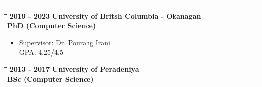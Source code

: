 \documentclass[a4paper,11pt]{article}
\begin{document}
\vspace{15pt}
\noindent\textbf{\large{}}
\vspace{-8pt}\noindent\\\rule{0.75\textwidth}{0.4pt}
\vspace{-8pt}
\begin{tabbing}
  \=\hspace*{3cm}\=\hspace*{3cm}\= \kill
  \>\textbf{\large \textbar{}}\textbf{ 2019 - 2023} \> \textbf{University of Britsh Columbia - Okanagan} \\ \> \> \textbf{PhD (Computer Science)}
\end{tabbing}
\begin{itemize}
\item[] Supervisor: Dr. Pourang Irani\\
  GPA: 4.25/4.5
\end{itemize}
\begin{tabbing}
  \=\hspace*{3cm}\=\hspace*{3cm}\= \kill
  \>\textbf{\large \textbar{}}\textbf{ 2013 - 2017} \> \textbf{University of Peradeniya} \\ \> \> \textbf{BSc (Computer Science)}
\end{tabbing}
\end{document}
